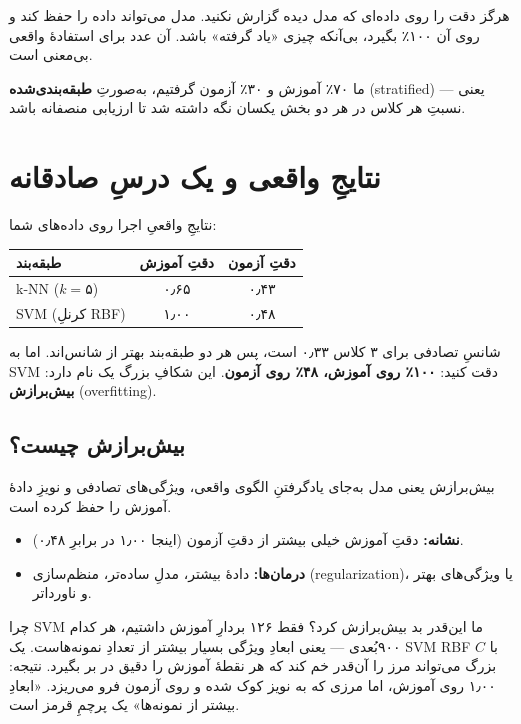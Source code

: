 \documentclass[12pt,a4paper]{article}
\begin{document}
\begin{hoshdar}
هرگز دقت را روی داده‌ای که مدل دیده گزارش نکنید. مدل می‌تواند داده را حفظ کند و روی آن ۱۰۰٪ بگیرد، بی‌آنکه چیزی «یاد گرفته» باشد. آن عدد برای استفادهٔ واقعی بی‌معنی است.
\end{hoshdar}

ما ۷۰٪ آموزش و ۳۰٪ آزمون گرفتیم، به‌صورتِ \textbf{طبقه‌بندی‌شده} (stratified) — یعنی نسبتِ هر کلاس در هر دو بخش یکسان نگه داشته شد تا ارزیابی منصفانه باشد.

\section{نتایجِ واقعی و یک درسِ صادقانه}

نتایجِ واقعیِ اجرا روی داده‌های شما:

\begin{center}
\begin{tabular}{@{}lcc@{}}
\hline
\textbf{طبقه‌بند} & \textbf{دقتِ آموزش} & \textbf{دقتِ آزمون} \\
\hline
k-NN ($k{=}۵$) & ۰٫۶۵ & ۰٫۴۳ \\
SVM (کرنلِ RBF) & ۱٫۰۰ & ۰٫۴۸ \\
\hline
\end{tabular}
\end{center}

شانسِ تصادفی برای ۳ کلاس $۰٫۳۳$ است، پس هر دو طبقه‌بند بهتر از شانس‌اند. اما به SVM دقت کنید: \textbf{۱۰۰٪ روی آموزش، ۴۸٪ روی آزمون}. این شکافِ بزرگ یک نام دارد: \textbf{بیش‌برازش} (overfitting).

\subsection{بیش‌برازش چیست؟}

بیش‌برازش یعنی مدل به‌جای یادگرفتنِ الگوی واقعی، ویژگی‌های تصادفی و نویزِ دادهٔ آموزش را حفظ کرده است.

\begin{itemize}
  \item \textbf{نشانه:} دقتِ آموزش خیلی بیشتر از دقتِ آزمون (اینجا ۱٫۰۰ در برابرِ ۰٫۴۸).
  \item \textbf{درمان‌ها:} دادهٔ بیشتر، مدلِ ساده‌تر، منظم‌سازی (regularization)، یا ویژگی‌های بهتر و ناوردا‌تر.
\end{itemize}

\begin{riyazi}
چرا SVMِ ما این‌قدر بد بیش‌برازش کرد؟ فقط ۱۲۶ بردارِ آموزش داشتیم، هر کدام ۹۰۰‌بُعدی — یعنی ابعادِ ویژگی بسیار بیشتر از تعدادِ نمونه‌هاست. یک SVMِ RBF با $C$ بزرگ می‌تواند مرز را آن‌قدر خم کند که هر نقطهٔ آموزش را دقیق در بر بگیرد. نتیجه: ۱٫۰۰ روی آموزش، اما مرزی که به نویز کوک شده و روی آزمون فرو می‌ریزد. «ابعادِ بیشتر از نمونه‌ها» یک پرچمِ قرمز است.
\end{riyazi}
\end{document}
